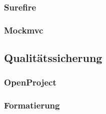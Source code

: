 \subsubsection{Surefire}
\subsubsection{Mockmvc}

\subsection{Qualitätssicherung}
\subsubsection{OpenProject}
\subsubsection{Formatierung}

